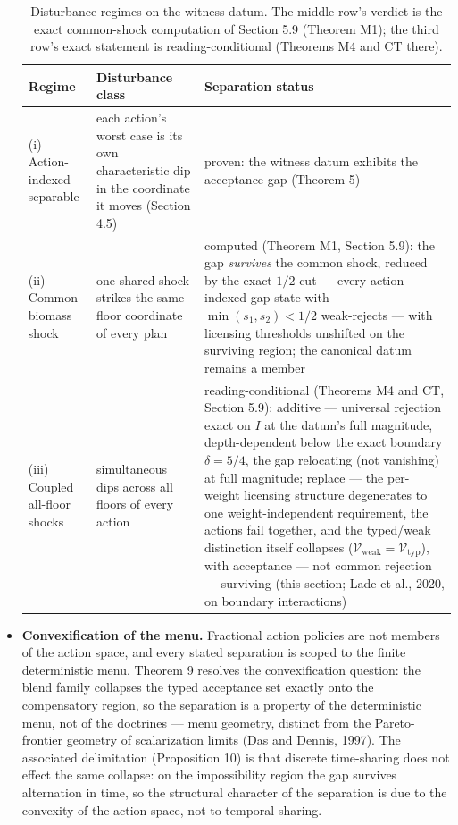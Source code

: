 \documentclass[3p,11pt]{elsarticle}
\begin{document}
\begin{itemize}
\begin{table}[htbp]
\centering
\small
\caption{Disturbance regimes on the witness datum. The middle row's
verdict is the exact common-shock computation of Section 5.9 (Theorem
M1); the third row's exact statement is reading-conditional (Theorems
M4 and CT there).}
\label{tab:disturbance}
\begin{tabular}{@{}p{3.1cm}p{4.0cm}p{6.3cm}@{}}
\toprule
Regime & Disturbance class & Separation status \\
\midrule
(i) Action-indexed separable & each action's worst case is its own characteristic dip in the coordinate it moves (Section 4.5) & proven: the witness datum exhibits the acceptance gap (Theorem 5) \\
(ii) Common biomass shock & one shared shock strikes the same floor coordinate of every plan & computed (Theorem M1, Section 5.9): the gap \emph{survives} the common shock, reduced by the exact \(1/2\)-cut --- every action-indexed gap state with \(\min(s_1, s_2) < 1/2\) weak-rejects --- with licensing thresholds unshifted on the surviving region; the canonical datum remains a member \\
(iii) Coupled all-floor shocks & simultaneous dips across all floors of every action & reading-conditional (Theorems M4 and CT, Section 5.9): additive --- universal rejection exact on \(I\) at the datum's full magnitude, depth-dependent below the exact boundary \(\delta = 5/4\), the gap relocating (not vanishing) at full magnitude; replace --- the per-weight licensing structure degenerates to one weight-independent requirement, the actions fail together, and the typed/weak distinction itself collapses (\(\mathcal{V}_{\mathrm{weak}} = \mathcal{V}_{\mathrm{typ}}\)), with acceptance --- not common rejection --- surviving (this section; Lade et al., 2020, on boundary interactions) \\
\bottomrule
\end{tabular}
\end{table}

\item
  \textbf{Convexification of the menu.} Fractional action policies are
  not members of the action space, and every stated separation is scoped
  to the finite deterministic menu. Theorem 9 resolves the convexification question: the blend family collapses the typed acceptance set exactly onto the compensatory
  region, so the separation is a property of the deterministic menu, not
  of the doctrines --- menu geometry, distinct from the Pareto-frontier
  geometry of scalarization limits (Das and Dennis, 1997). The
  associated delimitation (Proposition 10) is that discrete time-sharing
  does not effect the same collapse: on the impossibility region the gap
  survives alternation in time, so the structural character of the separation is due to the convexity of the action space, not to temporal sharing.
\end{itemize}
\end{document}
